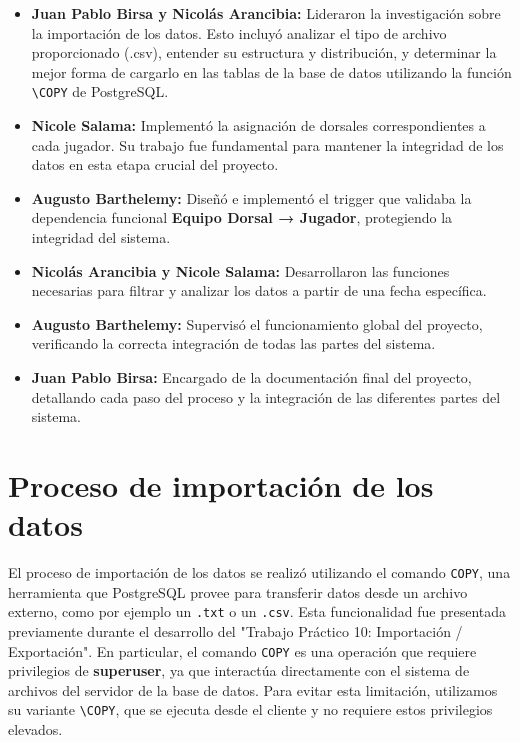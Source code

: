 \documentclass{article}
\begin{document}
\begin{itemize}[leftmargin=*]
    \item \textbf{Juan Pablo Birsa y Nicolás Arancibia:} Lideraron la investigación sobre la importación de los datos. Esto incluyó analizar el tipo de archivo proporcionado (.csv), entender su estructura y distribución, y determinar la mejor forma de cargarlo en las tablas de la base de datos utilizando la función \texttt{\textbackslash COPY} de PostgreSQL.
    
    \item \textbf{Nicole Salama:} Implementó la asignación de dorsales correspondientes a cada jugador. Su trabajo fue fundamental para mantener la integridad de los datos en esta etapa crucial del proyecto.
    
    \item \textbf{Augusto Barthelemy:} Diseñó e implementó el trigger que validaba la dependencia funcional \textbf{Equipo Dorsal → Jugador}, protegiendo la integridad del sistema.
    
    \item \textbf{Nicolás Arancibia y Nicole Salama:} Desarrollaron las funciones necesarias para filtrar y analizar los datos a partir de una fecha específica.
    
    \item \textbf{Augusto Barthelemy:} Supervisó el funcionamiento global del proyecto, verificando la correcta integración de todas las partes del sistema.
    
    \item \textbf{Juan Pablo Birsa:} Encargado de la documentación final del proyecto, detallando cada paso del proceso y la integración de las diferentes partes del sistema.
\end{itemize}


\section{Proceso de importación de los datos}

El proceso de importación de los datos se realizó utilizando el comando \texttt{COPY}, una herramienta que PostgreSQL provee para transferir datos desde un archivo externo, como por ejemplo un \texttt{.txt} o un \texttt{.csv}. Esta funcionalidad fue presentada previamente durante el desarrollo del "Trabajo Práctico 10: Importación / Exportación". En particular, el comando \texttt{COPY} es una operación que requiere privilegios de \textbf{superuser}, ya que interactúa directamente con el sistema de archivos del servidor de la base de datos. Para evitar esta limitación, utilizamos su variante \texttt{\textbackslash COPY}, que se ejecuta desde el cliente y no requiere estos privilegios elevados.
\end{document}
